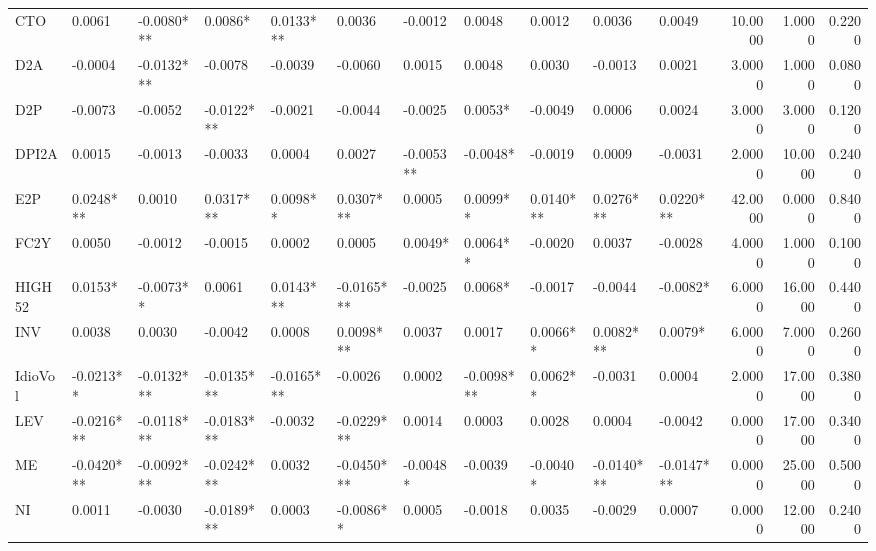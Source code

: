 \begin{tabular}{lllllllllllrrr}
CTO     &      0.0061 &  -0.0080*** &     0.0086* &   0.0133*** &      0.0036 &    -0.0012 &      0.0048 &     0.0012 &      0.0036 &      0.0049 &  10.0000 &   1.0000 &   0.2200 \\
D2A     &     -0.0004 &  -0.0132*** &     -0.0078 &     -0.0039 &     -0.0060 &     0.0015 &      0.0048 &     0.0030 &     -0.0013 &      0.0021 &   3.0000 &   1.0000 &   0.0800 \\
D2P     &     -0.0073 &     -0.0052 &  -0.0122*** &     -0.0021 &     -0.0044 &    -0.0025 &     0.0053* &    -0.0049 &      0.0006 &      0.0024 &   3.0000 &   3.0000 &   0.1200 \\
DPI2A   &      0.0015 &     -0.0013 &     -0.0033 &      0.0004 &      0.0027 &  -0.0053** &    -0.0048* &    -0.0019 &      0.0009 &     -0.0031 &   2.0000 &  10.0000 &   0.2400 \\
E2P     &   0.0248*** &      0.0010 &   0.0317*** &    0.0098** &   0.0307*** &     0.0005 &    0.0099** &  0.0140*** &   0.0276*** &   0.0220*** &  42.0000 &   0.0000 &   0.8400 \\
FC2Y    &      0.0050 &     -0.0012 &     -0.0015 &      0.0002 &      0.0005 &    0.0049* &    0.0064** &    -0.0020 &      0.0037 &     -0.0028 &   4.0000 &   1.0000 &   0.1000 \\
HIGH52  &     0.0153* &   -0.0073** &      0.0061 &   0.0143*** &  -0.0165*** &    -0.0025 &     0.0068* &    -0.0017 &     -0.0044 &    -0.0082* &   6.0000 &  16.0000 &   0.4400 \\
INV     &      0.0038 &      0.0030 &     -0.0042 &      0.0008 &   0.0098*** &     0.0037 &      0.0017 &   0.0066** &   0.0082*** &     0.0079* &   6.0000 &   7.0000 &   0.2600 \\
IdioVol &   -0.0213** &  -0.0132*** &  -0.0135*** &  -0.0165*** &     -0.0026 &     0.0002 &  -0.0098*** &   0.0062** &     -0.0031 &      0.0004 &   2.0000 &  17.0000 &   0.3800 \\
LEV     &  -0.0216*** &  -0.0118*** &  -0.0183*** &     -0.0032 &  -0.0229*** &     0.0014 &      0.0003 &     0.0028 &      0.0004 &     -0.0042 &   0.0000 &  17.0000 &   0.3400 \\
ME      &  -0.0420*** &  -0.0092*** &  -0.0242*** &      0.0032 &  -0.0450*** &   -0.0048* &     -0.0039 &   -0.0040* &  -0.0140*** &  -0.0147*** &   0.0000 &  25.0000 &   0.5000 \\
NI      &      0.0011 &     -0.0030 &  -0.0189*** &      0.0003 &   -0.0086** &     0.0005 &     -0.0018 &     0.0035 &     -0.0029 &      0.0007 &   0.0000 &  12.0000 &   0.2400 \\

\end{tabular}
